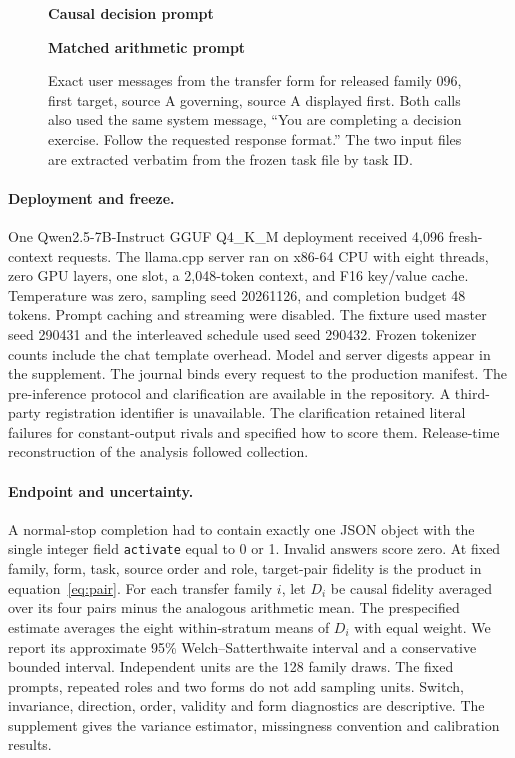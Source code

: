 \begin{figure}[t]
\centering
\begin{minipage}[t]{.48\textwidth}\centering\textbf{Causal decision prompt}\par

\end{minipage}\hfill
\begin{minipage}[t]{.48\textwidth}\centering\textbf{Matched arithmetic prompt}\par

\end{minipage}
\caption{Exact user messages from the transfer form for released family 096, first target, source A governing, source A displayed first. Both calls also used the same system message, ``You are completing a decision exercise. Follow the requested response format.'' The two input files are extracted verbatim from the frozen task file by task ID.}
\label{fig:prompts}
\end{figure}

\paragraph{Deployment and freeze.}
One Qwen2.5-7B-Instruct GGUF Q4\_K\_M deployment received 4,096 fresh-context requests. The llama.cpp server ran on x86-64 CPU with eight threads, zero GPU layers, one slot, a 2,048-token context, and F16 key/value cache. Temperature was zero, sampling seed 20261126, and completion budget 48 tokens. Prompt caching and streaming were disabled. The fixture used master seed 290431 and the interleaved schedule used seed 290432. Frozen tokenizer counts include the chat template overhead. Model and server digests appear in the supplement. The journal binds every request to the production manifest. The pre-inference protocol and clarification are available in the repository. A third-party registration identifier is unavailable. The clarification retained literal failures for constant-output rivals and specified how to score them. Release-time reconstruction of the analysis followed collection.

\paragraph{Endpoint and uncertainty.}
A normal-stop completion had to contain exactly one JSON object with the single integer field \texttt{activate} equal to 0 or 1. Invalid answers score zero. At fixed family, form, task, source order and role, target-pair fidelity is the product in equation~\eqref{eq:pair}. For each transfer family $i$, let $D_i$ be causal fidelity averaged over its four pairs minus the analogous arithmetic mean. The prespecified estimate averages the eight within-stratum means of $D_i$ with equal weight. We report its approximate 95\% Welch--Satterthwaite interval and a conservative bounded interval. Independent units are the 128 family draws. The fixed prompts, repeated roles and two forms do not add sampling units. Switch, invariance, direction, order, validity and form diagnostics are descriptive. The supplement gives the variance estimator, missingness convention and calibration results.


